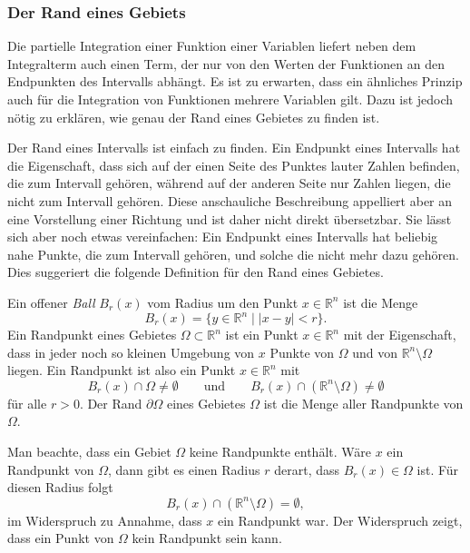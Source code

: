 %
%
\subsubsection{Der Rand eines Gebiets}
Die partielle Integration einer Funktion einer Variablen liefert
neben dem Integralterm auch einen Term, der nur von den Werten der
Funktionen an den Endpunkten des Intervalls abhängt.
Es ist zu erwarten, dass ein ähnliches Prinzip auch für die
Integration von Funktionen mehrere Variablen gilt.
Dazu ist jedoch nötig zu erklären, wie genau der Rand eines
Gebietes zu finden ist.

Der Rand eines Intervalls ist einfach zu finden.
Ein Endpunkt eines Intervalls hat die Eigenschaft, dass sich
auf der einen Seite des Punktes lauter Zahlen befinden, die zum
Intervall gehören, während auf der anderen Seite nur Zahlen liegen,
die nicht zum Intervall gehören.
Diese anschauliche Beschreibung appelliert aber an eine Vorstellung
einer Richtung und ist daher nicht direkt übersetzbar.
Sie lässt sich aber noch etwas vereinfachen: Ein Endpunkt eines
Intervalls hat beliebig nahe Punkte, die zum Intervall gehören, und
solche die nicht mehr dazu gehören.
Dies suggeriert die folgende Definition für den Rand eines Gebietes.

\begin{definition}[Rand]
\label{buch:felder:fundamentallemma:def:rand}
Ein offener {\em Ball} $B_r(x)$ vom Radius um den Punkt $x\in\mathbb{R}^n$
%
ist die Menge
\[
B_r(x)
=
\{y\in\mathbb{R}^n \mid |x-y|<r\}.
\]
Ein Randpunkt eines Gebietes $\Omega\subset\mathbb{R}^n$ ist ein Punkt
$x\in\mathbb{R}^n$ mit der Eigenschaft, dass in jeder noch so kleinen 
Umgebung von $x$ Punkte von $\Omega$ und von $\mathbb{R}^n\setminus\Omega$
liegen.
Ein Randpunkt ist also ein Punkt $x\in\mathbb{R}^n$ mit
\[
B_r(x)\cap \Omega\ne \emptyset
\qquad\text{und}\qquad
B_r(x)\cap (\mathbb{R}^n\setminus \Omega)
\ne \emptyset
\]
für alle $r>0$.
Der Rand $\partial \Omega$ eines Gebietes $\Omega$ ist die Menge
aller Randpunkte von $\Omega$.
\end{definition}

Man beachte, dass ein Gebiet $\Omega$ keine Randpunkte enthält.
Wäre $x$ ein Randpunkt von $\Omega$, dann gibt es einen Radius $r$
derart, dass $B_r(x)\in\Omega$ ist.
Für diesen Radius folgt
\[
B_r(x)\cap (\mathbb{R}^n\setminus\Omega)
=
\emptyset,
\]
im Widerspruch zu Annahme, dass $x$ ein Randpunkt war.
Der Widerspruch zeigt, dass ein Punkt von $\Omega$ kein Randpunkt
sein kann.

